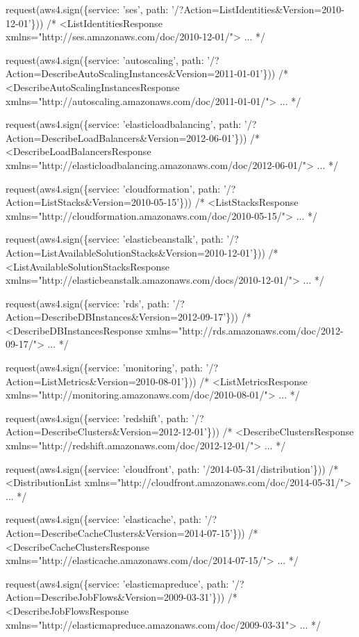 \begin{DoxyCode}
request(aws4.sign(\{service: 'ses', path: '/?Action=ListIdentities&Version=2010-12-01'\}))
/*
<ListIdentitiesResponse xmlns="http://ses.amazonaws.com/doc/2010-12-01/">
...
*/

request(aws4.sign(\{service: 'autoscaling', path:
       '/?Action=DescribeAutoScalingInstances&Version=2011-01-01'\}))
/*
<DescribeAutoScalingInstancesResponse xmlns="http://autoscaling.amazonaws.com/doc/2011-01-01/">
...
*/

request(aws4.sign(\{service: 'elasticloadbalancing', path:
       '/?Action=DescribeLoadBalancers&Version=2012-06-01'\}))
/*
<DescribeLoadBalancersResponse xmlns="http://elasticloadbalancing.amazonaws.com/doc/2012-06-01/">
...
*/

request(aws4.sign(\{service: 'cloudformation', path: '/?Action=ListStacks&Version=2010-05-15'\}))
/*
<ListStacksResponse xmlns="http://cloudformation.amazonaws.com/doc/2010-05-15/">
...
*/

request(aws4.sign(\{service: 'elasticbeanstalk', path:
       '/?Action=ListAvailableSolutionStacks&Version=2010-12-01'\}))
/*
<ListAvailableSolutionStacksResponse xmlns="http://elasticbeanstalk.amazonaws.com/docs/2010-12-01/">
...
*/

request(aws4.sign(\{service: 'rds', path: '/?Action=DescribeDBInstances&Version=2012-09-17'\}))
/*
<DescribeDBInstancesResponse xmlns="http://rds.amazonaws.com/doc/2012-09-17/">
...
*/

request(aws4.sign(\{service: 'monitoring', path: '/?Action=ListMetrics&Version=2010-08-01'\}))
/*
<ListMetricsResponse xmlns="http://monitoring.amazonaws.com/doc/2010-08-01/">
...
*/

request(aws4.sign(\{service: 'redshift', path: '/?Action=DescribeClusters&Version=2012-12-01'\}))
/*
<DescribeClustersResponse xmlns="http://redshift.amazonaws.com/doc/2012-12-01/">
...
*/

request(aws4.sign(\{service: 'cloudfront', path: '/2014-05-31/distribution'\}))
/*
<DistributionList xmlns="http://cloudfront.amazonaws.com/doc/2014-05-31/">
...
*/

request(aws4.sign(\{service: 'elasticache', path: '/?Action=DescribeCacheClusters&Version=2014-07-15'\}))
/*
<DescribeCacheClustersResponse xmlns="http://elasticache.amazonaws.com/doc/2014-07-15/">
...
*/

request(aws4.sign(\{service: 'elasticmapreduce', path: '/?Action=DescribeJobFlows&Version=2009-03-31'\}))
/*
<DescribeJobFlowsResponse xmlns="http://elasticmapreduce.amazonaws.com/doc/2009-03-31">
...
*/


\end{DoxyCode}
